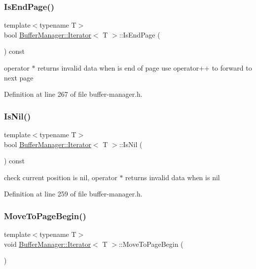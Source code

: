 \subsubsection{\texorpdfstring{IsEndPage()}{IsEndPage()}}
{\footnotesize\ttfamily template$<$typename T$>$ \\
bool \mbox{\hyperlink{class_buffer_manager_1_1_iterator}{Buffer\+Manager\+::\+Iterator}}$<$ T $>$\+::Is\+End\+Page (\begin{DoxyParamCaption}{ }\end{DoxyParamCaption}) const\hspace{0.3cm}{\ttfamily [inline]}}

{\ttfamily operator $\ast$} returns invalid data when is end of page use {\ttfamily operator++} to forward to next page 

Definition at line 267 of file buffer-\/manager.\+h.

\mbox{\label{class_buffer_manager_1_1_iterator_ad19030c51bf30e6d6e9e2e560cc511c4}} 
\subsubsection{\texorpdfstring{IsNil()}{IsNil()}}
{\footnotesize\ttfamily template$<$typename T$>$ \\
bool \mbox{\hyperlink{class_buffer_manager_1_1_iterator}{Buffer\+Manager\+::\+Iterator}}$<$ T $>$\+::Is\+Nil (\begin{DoxyParamCaption}{ }\end{DoxyParamCaption}) const\hspace{0.3cm}{\ttfamily [inline]}}

check current position is nil, {\ttfamily operator $\ast$} returns invalid data when is nil 

Definition at line 259 of file buffer-\/manager.\+h.

\mbox{\label{class_buffer_manager_1_1_iterator_a5fcb5fb10746e3d58736959a12610dd0}} 
\subsubsection{\texorpdfstring{MoveToPageBegin()}{MoveToPageBegin()}}
{\footnotesize\ttfamily template$<$typename T$>$ \\
void \mbox{\hyperlink{class_buffer_manager_1_1_iterator}{Buffer\+Manager\+::\+Iterator}}$<$ T $>$\+::Move\+To\+Page\+Begin (\begin{DoxyParamCaption}{ }\end{DoxyParamCaption})\hspace{0.3cm}{\ttfamily [inline]}}

